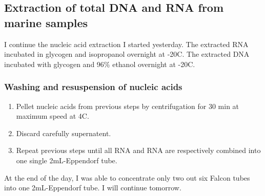 \subsection{Extraction of total DNA and RNA from marine samples}
\label{task:20180104_cj1}

I continue the nucleic acid extraction I started yesterday. The extracted RNA incubated in glycogen and isopropanol overnight at -20\degree C. The extracted DNA incubated with glycogen and 96\% ethanol overnight at -20\degree C. 

\subsubsection{Washing and resuspension of nucleic acids}

\begin{enumerate}
\item Pellet nucleic acids from previous steps by centrifugation for 30 min at maximum speed at 4\degree C.
\item Discard carefully supernatent.
\item Repeat previous steps until all RNA and RNA are respectively combined into one single 2mL-Eppendorf tube.
\end{enumerate}

At the end of the day, I was able to concentrate only two out six Falcon tubes into one 2mL-Eppendorf tube. I will continue tomorrow.
